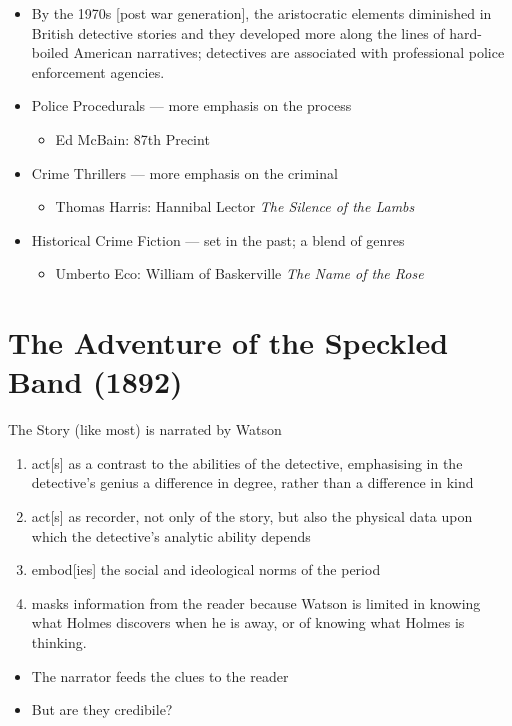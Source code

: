 \documentclass[a4paper,landscape,headrule,footrule,xetex]{foils}
\begin{document}
  
\begin{itemize}
  \item  By the 1970s [post war generation], the aristocratic
      elements diminished in British detective stories and they
      developed more along the lines of hard-boiled American
      narratives; detectives are associated with professional police
      enforcement agencies.  
    \item Police Procedurals --- more emphasis on the process
      \begin{itemize}
      \item Ed McBain: 87th Precint
      \end{itemize}
    \item Crime Thrillers --- more emphasis on the criminal
      \begin{itemize}
      \item Thomas Harris: Hannibal Lector \textit{The Silence of the Lambs}
      \end{itemize}
    \item Historical Crime Fiction --- set in the past; a blend of
      genres
      \begin{itemize}
      \item Umberto Eco: William of Baskerville \textit{The Name of
          the Rose}
      \end{itemize}
 \end{itemize}

\section{The Adventure of the Speckled Band   (1892)}




The Story (like most) is narrated by Watson
\begin{enumerate}
  \item  act[s] as a contrast to the abilities of the detective, emphasising in the detective's genius a difference in degree, rather than a difference in kind
  \item  act[s] as recorder, not only of the story, but also the physical data upon which the detective’s analytic ability depends
  \item  embod[ies] the social and ideological norms of the period
  \item  masks information from the reader because Watson is limited in knowing what Holmes discovers when he is away, or of knowing what Holmes is thinking.
  \end{enumerate}
  \begin{itemize}
  \item The narrator feeds the clues to the reader
  \item But are they credibile?
  \end{itemize}
\end{document}
